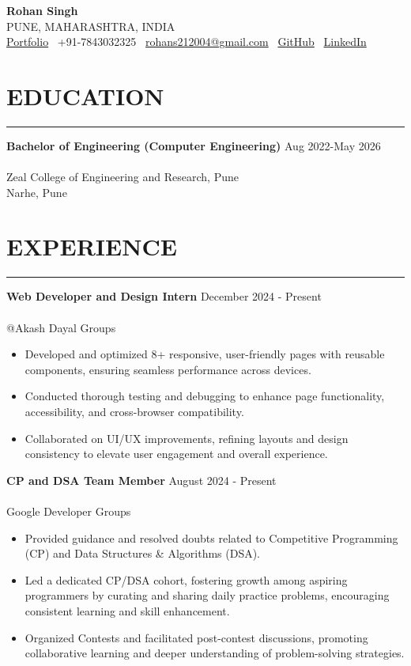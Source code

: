 \documentclass[a4paper,10pt]{article}
\newcommand{\experienceitem}[2]{%
    \noindent\textbf{#1} \hfill #2 \\
    \vspace{-0.9em}
}
\newcommand{\sectionline}[1]{%
    \par\noindent\rule[0.5ex]{\linewidth}{0.5pt}\vspace{-0.3em}%
}
\begin{document}
\begin{center}
   \textbf{\Large Rohan Singh}\\
   
    PUNE, MAHARASHTRA, INDIA \\
    \href{https://rohans21.vercel.app/}{Portfolio} \textbar\ 
    +91-7843032325 \textbar\ 
    \href{mailto:rohans212004@gmail.com}{rohans212004@gmail.com} \textbar\ 
    \href{https://github.com/Rohs21}{GitHub} \textbar\ 
    \href{https://www.linkedin.com/in/rohan-singh-8872322b8/}{LinkedIn}
\end{center}

\vspace{-0.6em}
\section*{EDUCATION}
\sectionline{}
\experienceitem{Bachelor of Engineering (Computer Engineering)}{Aug 2022-May 2026} \\
Zeal College of Engineering and Research, Pune \\
Narhe, Pune

\vspace{-0.1em}
\section*{EXPERIENCE}
\sectionline{}
\experienceitem{Web Developer and Design Intern}{December 2024 - Present} \\
@Akash Dayal Groups
\begin{itemize}[leftmargin=0.5in]
    \item Developed and optimized 8+ responsive, user-friendly pages with reusable components, ensuring seamless performance across devices.
    \item Conducted thorough testing and debugging to enhance page functionality, accessibility, and cross-browser compatibility.
    \item Collaborated on UI/UX improvements, refining layouts and design consistency to elevate user engagement and overall experience.
\end{itemize}

\experienceitem{CP and DSA Team Member}{August 2024 - Present} \\
Google Developer Groups
\begin{itemize}[leftmargin=0.5in]
    \item Provided guidance and resolved doubts related to Competitive Programming (CP) and Data Structures \& Algorithms (DSA).
    \item Led a dedicated CP/DSA cohort, fostering growth among aspiring programmers by curating and sharing daily practice problems, encouraging consistent learning and skill enhancement.
    \item Organized Contests and facilitated post-contest discussions, promoting collaborative learning and deeper understanding of problem-solving strategies.
\end{itemize}
\end{document}
